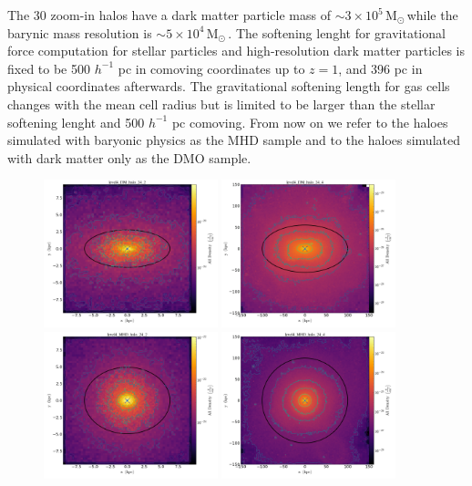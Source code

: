 \documentclass[usenatbib]{mnras}
\newcommand{\Msun}{\,{\rm M}$_{\odot}$\,}
\begin{document}
The 30 zoom-in halos have a dark matter particle mass of $\sim 3\times
10^5$\Msun while the barynic mass resolution is $\sim 5\times 10^4$\Msun.
The softening lenght for gravitational force computation for stellar
particles and high-resolution dark matter particles 
is fixed to be 500 $h^{-1}$ pc in comoving coordinates up to $z=1$,
and 396 pc in physical coordinates afterwards.
The gravitational softening length for gas cells changes with the mean
cell radius but is limited to be larger than the stellar softening
lenght and 500 $h^{-1}$ pc comoving. 
From now on we refer to the haloes simulated with baryonic physics as the
MHD sample and to the haloes simulated with dark matter only as the
DMO sample.


\begin{figure}
\includegraphics[width=0.45\textwidth]{level4_DM_halo_24_2.png}
\includegraphics[width=0.45\textwidth]{level4_DM_halo_24_4.png}
\includegraphics[width=0.45\textwidth]{level4_MHD_halo_24_2.png}
\includegraphics[width=0.45\textwidth]{level4_MHD_halo_24_4.png}

\end{figure}
\end{document}
